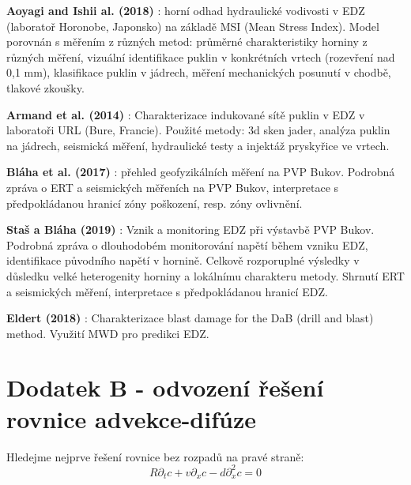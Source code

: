 \documentclass{article}
\def\prtl{\partial}
\begin{document}
{\bf Aoyagi and Ishii al. (2018)} \cite{Aoyagi2018}: horní odhad hydraulické vodivosti v EDZ (laboratoř Horonobe, Japonsko) na základě MSI (Mean Stress Index). Model porovnán s měřením z různých metod: průměrné charakteristiky horniny z různých měření, vizuální identifikace puklin v konkrétních vrtech (rozevření nad 0,1 mm), klasifikace puklin v jádrech, měření mechanických posunutí v chodbě, tlakové zkoušky.

{\bf Armand et al. (2014)} \cite{Armand2014}: Charakterizace indukované sítě puklin v EDZ v laboratoři URL (Bure, Francie). Použité metody: 3d sken jader, analýza puklin na jádrech, seismická měření, hydraulické testy a injektáž pryskyřice ve vrtech. 

{\bf Bláha et al. (2017)} \cite{SURAO_184/2014}: přehled geofyzikálních měření na PVP Bukov.
Podrobná zpráva o ERT a seismických měřeních na PVP Bukov, interpretace s předpokládanou hranicí zóny poškození, resp. zóny ovlivnění.  

{\bf Staš a Bláha (2019)} \cite{SURAO_351/2019}: Vznik a monitoring EDZ při výstavbě PVP Bukov.
Podrobná zpráva o dlouhodobém monitorování napětí během vzniku EDZ, identifikace původního napětí v hornině. Celkově rozporuplné výsledky v důsledku velké heterogenity horniny a lokálnímu charakteru metody. Shrnutí ERT a seismických měření, interpretace s předpokládanou hranicí EDZ.  

{\bf Eldert (2018)} \cite{JeroenvanEldert2018}: Charakterizace blast damage for the DaB (drill and blast) method. Využití MWD pro predikci EDZ.





\pagebreak






\section*{Dodatek B - odvození řešení rovnice advekce-difúze}
Hledejme nejprve řešení rovnice bez rozpadů na pravé straně:
\begin{equation}
    \label{eq:no_decay_ad}
    R\prtl_t c + v \prtl_x c - d \prtl^2_x c = 0
\end{equation}
\end{document}
